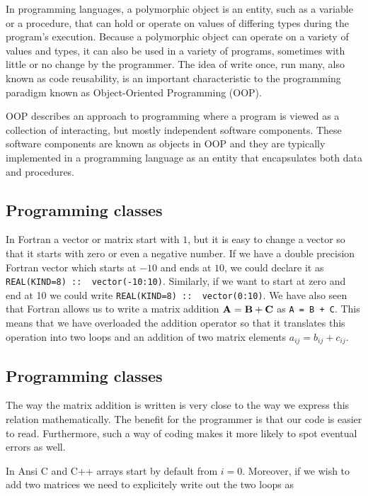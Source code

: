 \documentclass[%
oneside,                 %
final,                   %
10pt]{article}
\begin{document}
{{{{{{{{{{{In programming languages, a polymorphic object is an entity, such as a variable or a procedure, that can hold or operate on values of differing types during the program's execution. Because a polymorphic object can operate on a variety of values and types, it can also be used in a variety of programs, sometimes with little or no change by the programmer. The idea of write once, run many, also known as code reusability, is an important characteristic to the programming paradigm known as Object-Oriented Programming (OOP).

OOP describes an approach to programming where a program is viewed as a collection of interacting, but mostly independent software components. These software components are known as objects in OOP and they are typically implemented in a programming language as an entity that encapsulates both data and procedures.

\subsection{Programming classes}

In Fortran a vector or matrix start with $1$, but it is easy
to change a vector so that it starts with zero or even a negative number.
If we have a double precision Fortran vector  which starts at $-10$ and ends at $10$, we could declare it as
\Verb!REAL(KIND=8) ::  vector(-10:10)!. Similarly, if we want to start at zero and end at 10 we could write
\Verb!REAL(KIND=8) ::  vector(0:10)!.
We have also seen that Fortran  allows us to write a matrix addition ${\bf A} = {\bf B}+{\bf C}$ as
\Verb!A = B + C!.  This means that we have overloaded the addition operator so that it translates this operation into
two loops and an addition of two matrix elements $a_{ij} = b_{ij}+c_{ij}$.

\subsection{Programming classes}

The way the matrix addition is written is very close to the way we express this relation mathematically. The benefit for the
programmer is that our code is easier to read. Furthermore, such a way of coding makes it  more likely  to spot eventual
errors as well.

In Ansi C and C++ arrays start by default from $i=0$.  Moreover, if we  wish to add two matrices we need to explicitely write out
the two loops as

}}}}}}}}}}}
\end{document}
